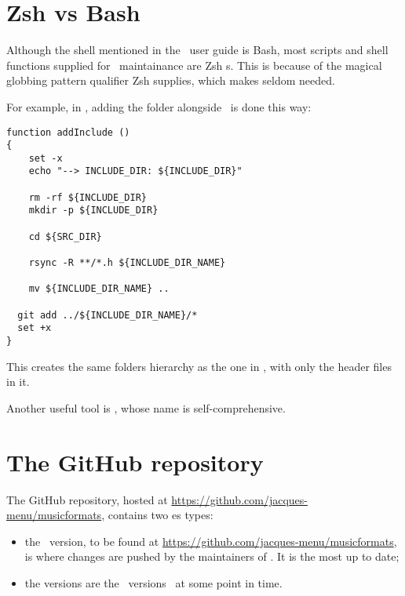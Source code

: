 \section{Zsh vs Bash}

Although the shell mentioned in the \mf\ user guide is Bash, most scripts and shell functions supplied for \mf\ maintainance are Zsh s.
This is because of the magical globbing pattern qualifier \code{**/} Zsh supplies, which makes  seldom needed.

For example, in , adding the  folder alongside \srcFolder\ is done this way:
\begin{lstlisting}[language=Terminal]
function addInclude ()
{
	set -x
	echo "--> INCLUDE_DIR: ${INCLUDE_DIR}"

	rm -rf ${INCLUDE_DIR}
	mkdir -p ${INCLUDE_DIR}

	cd ${SRC_DIR}

	rsync -R **/*.h ${INCLUDE_DIR_NAME}

	mv ${INCLUDE_DIR_NAME} ..

  git add ../${INCLUDE_DIR_NAME}/*
  set +x
}
\end{lstlisting}

This creates the same folders hierarchy as the one in \srcFolder, with only the  header files in it.

Another useful tool is , whose name is self-comprehensive.


\section{The GitHub repository}

The GitHub repository, hosted at \url{https://github.com/jacques-menu/musicformats}, contains two \branch es types:
\begin{itemize}
\item the  \master\ version, to be found at \url{https://github.com/jacques-menu/musicformats}, is where changes are pushed by the maintainers of \mf. It is the most up to date;
\item the  versions are the \master\ versions \frozen\ at some point in time.
\end{itemize}
